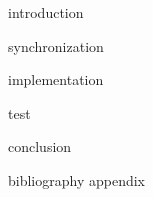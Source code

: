 \documentclass[a4paper, notitlepage, twoside]{report}
\begin{document}


\null
\thispagestyle{empty}
\newpage

\setcounter{page}{1}
\lhead{\fancyplain{}{\textsf{\nouppercase{\leftmark}}}} %
\rhead{\fancyplain{\textsf{\thepage}}{\textsf{\thepage}}}

{introduction}		%

\cleardoublepage
{synchronization}		%

\cleardoublepage
{implementation}		%

\cleardoublepage
{test}			%

\cleardoublepage
{conclusion}		%

\singlespace %
{bibliography}		%
\onehalfspacing %
{appendix}
\end{document}
